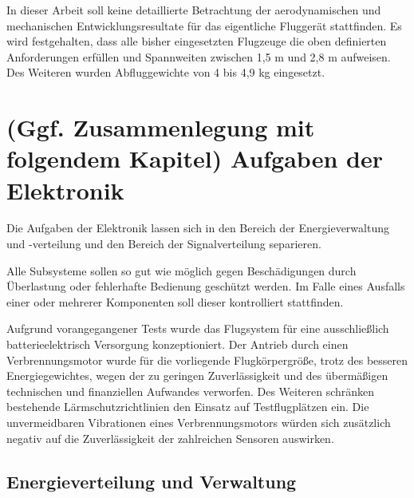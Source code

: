 In dieser Arbeit soll keine detaillierte Betrachtung der aerodynamischen und mechanischen Entwicklungsresultate für das eigentliche Fluggerät stattfinden. Es wird festgehalten, dass alle bisher eingesetzten Flugzeuge die oben definierten Anforderungen erfüllen und Spannweiten zwischen 1,5 m und 2,8 m aufweisen. Des Weiteren wurden Abfluggewichte von 4 bis 4,9 kg eingesetzt.


\section{(Ggf. Zusammenlegung mit folgendem Kapitel) Aufgaben der Elektronik}

Die Aufgaben der Elektronik lassen sich in den Bereich der Energieverwaltung und -verteilung  und den Bereich der Signalverteilung separieren.

Alle Subsysteme sollen so gut wie möglich gegen Beschädigungen durch Überlastung oder fehlerhafte Bedienung geschützt werden. Im Falle eines Ausfalls einer oder mehrerer Komponenten soll dieser kontrolliert stattfinden.

\begin{comment}??? Wenn möglich soll ein kontrollierter Ausfall der Komponenten in bekannten Zuständen realisiert werden. ???\end{comment}

Aufgrund vorangegangener Tests wurde das Flugsystem für eine ausschließlich batterieelektrisch Versorgung konzeptioniert. Der Antrieb durch einen Verbrennungsmotor wurde für die vorliegende Flugkörpergröße, trotz des besseren Energiegewichtes, wegen der zu geringen Zuverlässigkeit und des übermäßigen technischen und finanziellen Aufwandes verworfen. Des Weiteren schränken bestehende Lärmschutzrichtlinien den Einsatz auf Testflugplätzen ein. Die unvermeidbaren Vibrationen eines Verbrennungsmotors würden sich zusätzlich negativ auf die Zuverlässigkeit der zahlreichen Sensoren auswirken.

\clearpage

\subsection{Energieverteilung und Verwaltung}


